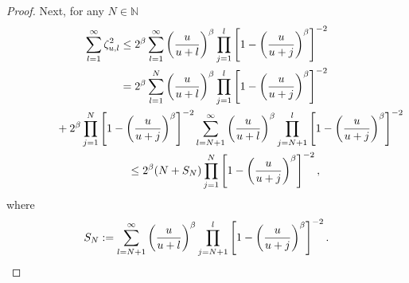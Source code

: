 \documentclass[pdftex]{sigma}
\numberwithin{equation}{section}
\begin{document}
\begin{proof}
Next, for any $N\in\mathbb N$
\begin{gather*}
\sum_{l=1}^\infty \zeta_{u,l}^2 \le
2^\beta \sum_{l=1}^\infty \left ( {u\over u+l}\right )^\beta\prod_{j=1}^l \left [1-\left ({u\over u+j}\right )^\beta\right ]^{-2} \\
\hphantom{\sum_{l=1}^\infty \zeta_{u,l}^2}{} =
2^\beta \sum_{l=1}^N \left ( {u\over u+l}\right )^\beta\prod_{j=1}^l \left [1-\left ({u\over u+j}\right )^\beta\right ]^{-2} \\
\hphantom{\sum_{l=1}^\infty \zeta_{u,l}^2\le }{} + 2^\beta \prod_{j=1}^N \left [1-\left ({u\over u+j}\right )^\beta\right ]^{-2}
\sum_{l=N+1}^\infty \left ( {u\over u+l}\right )^\beta\prod_{j=N+1}^l \left [1-\left ({u\over u+j}\right )^\beta\right ]^{-2}\\
\hphantom{\sum_{l=1}^\infty \zeta_{u,l}^2}{}\le 2^\beta (N+S_N) \prod_{j=1}^N \left [1-\left ({u\over u+j}\right )^\beta\right ]^{-2},
\end{gather*}
where
\begin{gather*}
S_N:=\sum_{l=N+1}^\infty \left ( {u\over u+l}\right )^\beta\prod_{j=N+1}^l \left [1-\left ({u\over u+j}\right )^\beta\right ]^{-2}.
\end{gather*}


\end{proof}
\end{document}
